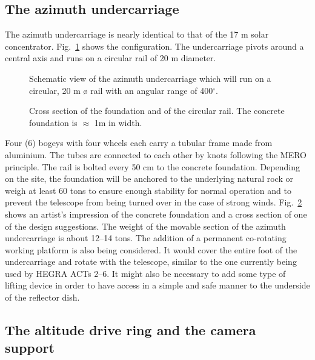 \subsection{The azimuth undercarriage}


\medskip The azimuth undercarriage is nearly identical to that of the 17 m
solar concentrator. Fig.~\ref{fig-carriage} shows the configuration.
The undercarriage pivots around a central axis and runs on a circular rail
of 20 m diameter.
\begin{figure}[htb]
\leavevmode
\centering
\epsfxsize=12cm
\caption{Schematic view of the azimuth undercarriage which
will run on a circular, 20 m {\o}
rail with an angular range of 400$^\circ$.}
\label{fig-carriage}
\end{figure}
\begin{figure}[htb]
\leavevmode
\centering
\epsfxsize=12cm
\caption{Cross section of the foundation and of the circular rail.
The concrete foundation is $\approx$ 1m in width.}
\label{fig-under}
\end{figure}

Four (6) bogeys with four wheels each carry a tubular frame made from
aluminium. The tubes are connected to each other by knots following the MERO
principle. The rail is bolted every 50 cm to the concrete foundation.
Depending on the site, the foundation will be anchored to the underlying
natural rock or weigh at least 60 tons to ensure enough stability for normal
operation and to prevent the telescope from being turned over in the case of
strong winds. Fig.~\ref{fig-under} shows an artist's impression of the concrete
foundation and a cross section of one of the design suggestions. The weight
of the movable section of the azimuth undercarriage is about 12--14 tons.
The addition of a permanent co-rotating working platform is also being
considered. It would cover the entire foot of the undercarriage and rotate
with the telescope, similar to the one currently being used by HEGRA ACTs
2--6. It might also be necessary to add some type of lifting device in order
to have access in a simple and safe manner to the underside of the reflector
dish.

\subsection{The altitude drive ring and the camera support}

